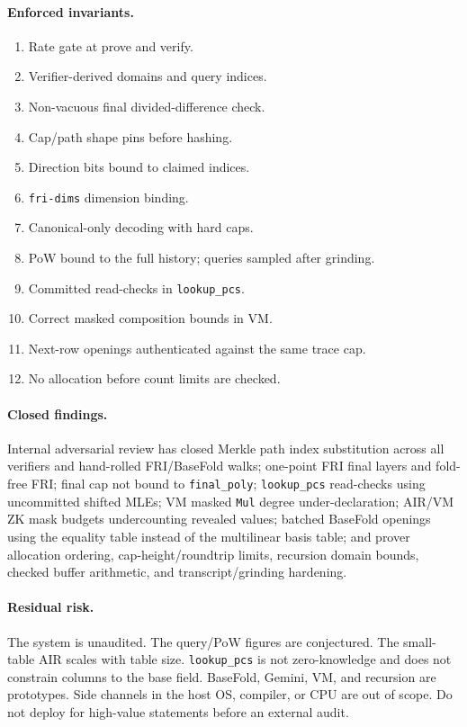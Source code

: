 \documentclass[11pt,a4paper]{article}
\begin{document}
\paragraph{Enforced invariants.}
\begin{enumerate}[leftmargin=1.3em]
\item Rate gate at prove and verify.
\item Verifier-derived domains and query indices.
\item Non-vacuous final divided-difference check.
\item Cap/path shape pins before hashing.
\item Direction bits bound to claimed indices.
\item \texttt{fri-dims} dimension binding.
\item Canonical-only decoding with hard caps.
\item PoW bound to the full history; queries sampled after grinding.
\item Committed read-checks in \texttt{lookup\_pcs}.
\item Correct masked composition bounds in VM.
\item Next-row openings authenticated against the same trace cap.
\item No allocation before count limits are checked.
\end{enumerate}

\paragraph{Closed findings.} Internal adversarial review has closed Merkle
path index substitution across all verifiers and hand-rolled FRI/BaseFold
walks; one-point FRI final layers and fold-free FRI; final cap not bound to
\texttt{final\_poly}; \texttt{lookup\_pcs} read-checks using uncommitted
shifted MLEs; VM masked \texttt{Mul} degree under-declaration; AIR/VM ZK mask
budgets undercounting revealed values; batched BaseFold openings using the
equality table instead of the multilinear basis table; and prover allocation
ordering, cap-height/roundtrip limits, recursion domain bounds, checked
buffer arithmetic, and transcript/grinding hardening.

\paragraph{Residual risk.} The system is unaudited. The query/PoW figures are
conjectured. The small-table AIR scales with table size. \texttt{lookup\_pcs}
is not zero-knowledge and does not constrain columns to the base field.
BaseFold, Gemini, VM, and recursion are prototypes. Side channels in the host
OS, compiler, or CPU are out of scope. Do not deploy for high-value statements
before an external audit.
\end{document}
